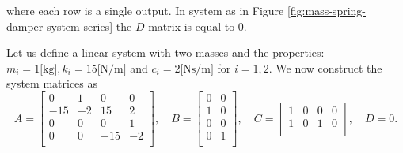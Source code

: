 where each row is a single output. In system as in Figure \ref{fig:mass-spring-damper-system-series} the $D$ matrix is equal to $0$.
\begin{example}\label{ex:system}
    Let us define a linear system with two masses and the properties: $m_i=1 \text{[kg]}, k_i=15\text{[N/m]}$ and $c_i=2 \text{[Ns/m]}$ for $i=1,2$. We now construct the system matrices as
    \begin{equation}\label{eqn:example-system}
    A =
    \begin{bmatrix}
        0 & 1 & 0 & 0 \\
        -15 & -2 & 15 & 2 \\
        0 & 0 & 0 & 1 \\
        0 & 0 & -15 & -2 \\
    \end{bmatrix}, \quad
    B = 
    \begin{bmatrix}
        0 & 0 \\
        1 & 0 \\
        0 & 0 \\
        0 & 1 \\
    \end{bmatrix}, \quad
    C =
    \begin{bmatrix}
        1 & 0 & 0 & 0 \\
        1 & 0 & 1 & 0 \\
    \end{bmatrix}, \quad
    D = 0.
    \end{equation}
\end{example}